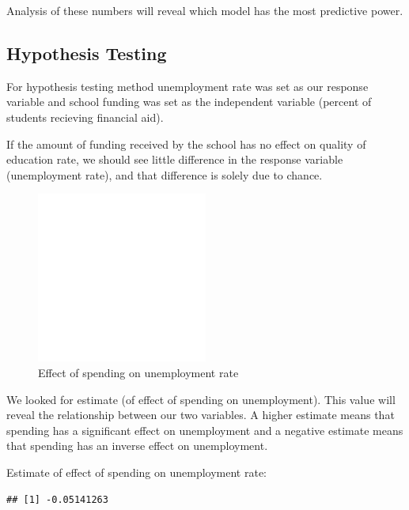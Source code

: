 \documentclass{article}\usepackage[]{graphicx}\usepackage[]{color}
\makeatletter
\newenvironment{kframe}{%
 \def\at@end@of@kframe{}%
 \ifinner\ifhmode%
  \def\at@end@of@kframe{\end{minipage}}%
  \begin{minipage}{\columnwidth}%
 \fi\fi%
 \def\FrameCommand##1{\hskip\@totalleftmargin \hskip-\fboxsep
 \colorbox{shadecolor}{##1}\hskip-\fboxsep
     \hskip-\linewidth \hskip-\@totalleftmargin \hskip\columnwidth}%
 \MakeFramed {\advance\hsize-\width
   \@totalleftmargin\z@ \linewidth\hsize
   \@setminipage}}%
 {\par\unskip\endMakeFramed%
 \at@end@of@kframe}
\newenvironment{knitrout}{}{} %
\makeatother
\begin{document}
Analysis of these numbers will reveal which model has the most predictive power.

\subsection{Hypothesis Testing}

For hypothesis testing method unemployment rate was set as our response variable and school funding was set as the independent variable (percent of students recieving financial aid).

If the amount of funding received by the school has no effect on quality of education rate, we should see little difference in the response variable (unemployment rate), and that difference is solely due to chance.


\graphicspath{ {../images/} }
\begin{figure}
\centering
\includegraphics[width=0.5\textwidth]{unemployment}
\caption{Effect of spending on unemployment rate}
\end{figure}



We looked for estimate (of effect of spending on unemployment). This value will reveal the relationship between our two variables.  A higher estimate means that spending has a significant effect on unemployment and a negative estimate means that spending has an inverse effect on unemployment.

Estimate of effect of spending on unemployment rate:
\begin{knitrout}
\color{fgcolor}\begin{kframe}
\begin{verbatim}
## [1] -0.05141263
\end{verbatim}
\end{kframe}
\end{knitrout}
\end{document}
